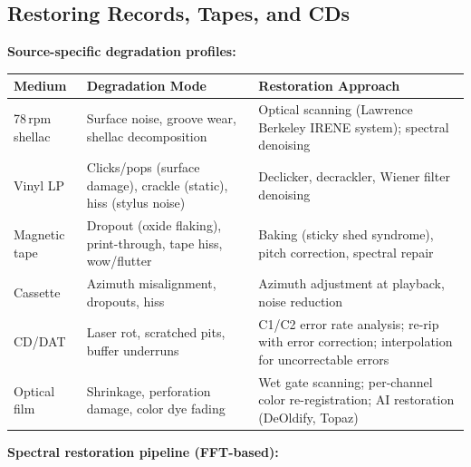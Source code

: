 \documentclass[11pt,letterpaper]{article}
\newcommand{\thead}[1]{\cellcolor{TableHead}\textbf{\sffamily\color{white}\small #1}}
\newcommand{\altrow}{\rowcolor{TableAlt}}
\begin{document}
\subsection{Restoring Records, Tapes, and CDs}

\textbf{Source-specific degradation profiles:}

\begin{longtable}{p{2.5cm}p{5cm}p{4.5cm}}
\toprule
\thead{Medium} & \thead{Degradation Mode} & \thead{Restoration Approach} \\
\midrule
\endhead
78\,rpm shellac & Surface noise, groove wear, shellac decomposition & Optical scanning (Lawrence Berkeley IRENE system); spectral denoising \\
\altrow Vinyl LP & Clicks/pops (surface damage), crackle (static), hiss (stylus noise) & Declicker, decrackler, Wiener filter denoising \\
Magnetic tape & Dropout (oxide flaking), print-through, tape hiss, wow/flutter & Baking (sticky shed syndrome), pitch correction, spectral repair \\
\altrow Cassette & Azimuth misalignment, dropouts, hiss & Azimuth adjustment at playback, noise reduction \\
CD/DAT & Laser rot, scratched pits, buffer underruns & C1/C2 error rate analysis; re-rip with error correction; interpolation for uncorrectable errors \\
\altrow Optical film & Shrinkage, perforation damage, color dye fading & Wet gate scanning; per-channel color re-registration; AI restoration (DeOldify, Topaz) \\
\bottomrule
\end{longtable}

\textbf{Spectral restoration pipeline (FFT-based):}
\end{document}
